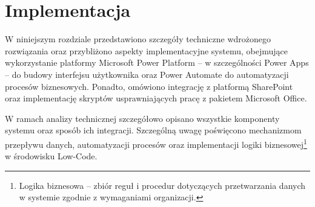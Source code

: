 \chapter{Implementacja}

W niniejszym rozdziale przedstawiono szczegóły techniczne wdrożonego rozwiązania oraz przybliżono aspekty implementacyjne systemu, obejmujące wykorzystanie platformy Microsoft Power Platform -- w szczególności Power Apps -- do budowy interfejsu użytkownika oraz Power Automate do automatyzacji procesów biznesowych.
Ponadto, omówiono integrację z platformą SharePoint oraz implementację skryptów usprawniających pracę z pakietem Microsoft Office.

W ramach analizy technicznej szczegółowo opisano wszystkie komponenty systemu oraz sposób ich integracji. Szczególną uwagę poświęcono mechanizmom przepływu danych, automatyzacji procesów oraz implementacji logiki biznesowej\footnote{Logika biznesowa -- zbiór reguł i procedur dotyczących przetwarzania danych w systemie zgodnie z wymaganiami organizacji.} w środowisku Low-Code.









\begin{comment}
W niniejszym rozdziale przedstawiono szczegóły techniczne zaimplementowanego rozwiązania. Omówione zostaną kluczowe aspekty
implementacyjne systemu, obejmujące wykorzystanie platformy Microsoft Power Platform - w szczególności
Power Apps do budowy interfejsu użytkownika oraz Power Automate do automatyzacji procesów biznesowych.
Ponadto, przedstawiona zostanie integracja z platformą SharePoint oraz implementacja skryptów
usprawniających pracę z pakietem Microsoft Office. Rozdział stanowi techniczne rozwinięcie przyjętych
założeń projektowych, prezentując metodykę realizacji poszczególnych komponentów systemu.

W ramach analizy technicznej zostaną szczegółowo omówione poszczególne komponenty systemu oraz sposób
ich integracji. Szczególna uwaga zostanie poświęcona mechanizmom przepływu danych, automatyzacji
procesów oraz implementacji logiki biznesowej w środowisku low-code. Ponadto poruszono napotkane problemy oraz ich rozwiązania.

 \end{comment}